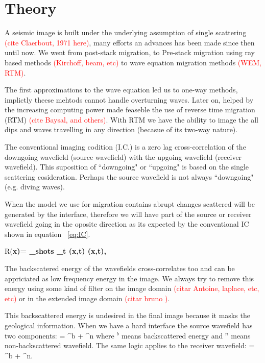 \section{Theory}

A seismic image is built under the underlying assumption of single 
scattering \textcolor{red}{(cite Claerbout, 1971 here)}, many efforts an advances has been made
since then until now. We went from post-stack migration, to Pre-stack migration
using ray based methods \textcolor{red}{(Kirchoff, beam, etc)} to wave equation migration methods
\textcolor{red}{(WEM, RTM)}.

The first approximations to the wave equation led us to one-way methods, implictly
theese mehtods cannot handle overturning waves.  Later on, helped by the increasing
computing power made feaseble the use of reverse time migration (RTM)  \textcolor{red}{(cite Baysal, and others)}. 
With RTM we have the ability to image the all dips and waves travelling in any direction (becasue of its
two-way nature).  


The conventional imaging codition (I.C.) is a zero lag cross-correlation of the downgoing wavefield (source 
wavefield) with the upgoing wavefield (receiver wavefield). This suposition of ``downgoing" or ``upgoing"
is based on the single scattering cosideration. Perhaps the source wavefield is not always ``downgoing" (e.g.
diving waves).

When the model we use for migration contains abrupt changes scattered will be generated by the interface,
therefore we will have part of the source or receiver wavefield going in the oposite direction as its expected 
by the conventional IC shown in equation ~\ref{eq:IC}.


\beq
R(\bf{x})= \sum_{shots} \sum_t \US(\bf{x},t) \UR(\bf{x},t),
\label{eq:IC}
\eeq

The backscatered energy of the wavefields cross-correlates too and can be appriciated as low frequency energy
in the image. We always try to remove this energy using some kind of filter on the image domain \textcolor{red}{(citar Antoine, laplace,
etc, etc)} or in the extended image domain \textcolor{red}{(citar bruno )}.

This backscattered energy is undesired in the final image because it masks the geological information. When we have a 
hard interface the source wavefield has two components:
\beq
\US= \US^b + \US^n
\eeq
where $^b$ means backscattered energy and $^n$ means non-backscattered wavefield. The same logic applies to 
the receiver wavefield:
\beq
\UR= \UR^b + \UR^n.
\eeq

